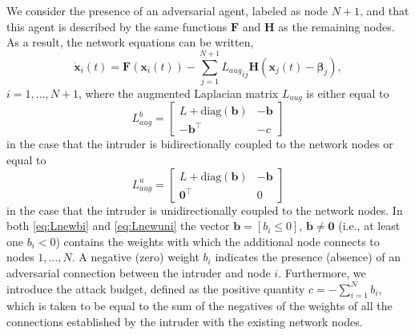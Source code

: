 \documentclass[%
 reprint,
 amsmath,amssymb,
 aip,
]{revtex4-2}
\def \bF {\pmb{F}}
\def \bH {\pmb{H}}
\def \bd {\pmb{d}}
\def \bd {\pmb{d}}
\def \bx {\pmb{x}}
\def \bb {\pmb{b}}
\def \bbeta {\pmb{\beta}}
\theoremstyle{italichead}
\theoremstyle{definition}
\begin{document}
{We consider the presence of an adversarial agent, labeled as node $N+1$, and that this agent is described by the same functions $\bF$ and $\bH$ as the remaining nodes.
As a result, the network equations can be written,
\begin{equation}
    \dot{\bx}_i (t)= \bF(\bx_i (t))-\sum_{j=1}^{N+1} {L_{aug}}_{ij} \bH(\bx_j (t) - \bbeta_j),
\end{equation}
$i=1,...,N+1$, where the augmented Laplacian matrix $L_{aug}$ is either equal to
\begin{equation} \label{eq:Lnewbi}
    L_{aug}^b = \begin{bmatrix}
        L + \text{diag}(\bb) & -\bb \\
        -\bb^\top & -c
    \end{bmatrix}
\end{equation}
in the case that the intruder is bidirectionally coupled to the network nodes or equal to
\begin{equation} \label{eq:Lnewuni}
    L_{aug}^u = \begin{bmatrix}
        L + \text{diag}(\bb) & -\bb \\
        \pmb{0}^\top & 0
    \end{bmatrix}
\end{equation}
in the case that the intruder is unidirectionally coupled to the network nodes.
In both \eqref{eq:Lnewbi} and \eqref{eq:Lnewuni} the vector $\bb=[b_i \leq 0]$, $\bb \neq \textbf{0}$ (i.e., at least one $b_i<0$) contains the weights with which the additional node connects to nodes $1,...,N$. {A negative (zero) weight $b_i$ indicates the presence (absence) of an adversarial connection between the intruder and node $i$.  Furthermore, we introduce the attack budget, defined as the positive quantity $c=-\sum_{i=1}^N b_i${, which is taken to be equal to the sum of the negatives of the weights of all the connections established by the intruder with the existing network nodes.}} %





}
\end{document}
